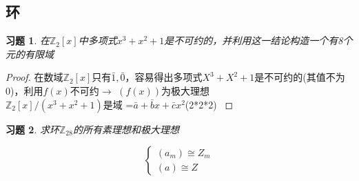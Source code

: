 \documentclass{report}
\newtheorem{proof}{证明}[section]
\newtheorem{exercise}{习题}[section]
\begin{document}
\subsection{环}
\begin{exercise}
在$\mathbb{Z}_{2}[x]$中多项式$x^3+x^2+1$是不可约的，并利用这一结论构造一个有8个元的有限域
\end{exercise}
\begin{proof}
\textcolor{lightdark}{在数域$\mathbb{Z}_{2}[x]$只有$\bar{1},\bar{0}$，容易得出多项式$X^3+X^2+1$是不可约的(其值不为0)，利用$f(x)$不可约$\rightarrow$ $(f(x))$为极大理想
\\  $\mathbb{Z}_{2}[x] \bigg/ (x^3+x^2+1)$是域
={$\bar{a}+\bar{b}x+\bar{c}x^2$}(2*2*2)
}
\end{proof}
\begin{exercise}
求环$\mathbb{Z}_{28}$的所有素理想和极⼤理想
\end{exercise}
$$
\begin{cases}
(a_{m}) \cong Z_{m} 
\\
(a)\cong Z
\end{cases} $$
\end{document}

